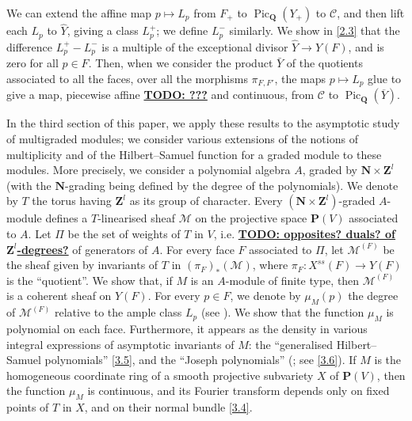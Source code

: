 \documentclass{article}
\newcommand{\sh}{\mathscr}
\newcommand{\PP}{\mathbf{P}}
\newcommand{\QQ}{\mathbf{Q}}
\newcommand{\NN}{\mathbf{N}}
\newcommand{\ZZ}{\mathbf{Z}}
\DeclareMathOperator{\Pic}{Pic}
\newcommand{\unsure}[1]{\underline{\textbf{TODO: #1}}}
\newcommand{\oldpage}[1]{\marginpar{\footnotesize$\Big\vert$ \textit{p.~#1}}}
\begin{document}
We can extend the affine map $p\mapsto L_p$ from $F_+$ to $\Pic_\QQ(Y_+)$ to $\mathcal{C}$, and then lift each $L_p$ to $\hat{Y}$, giving a class $L_p^+$;
we define $L_p^-$ similarly.
We show in \cref{2.3} that the difference $L_p^+ - L_p^-$ is a multiple of the exceptional divisor $\hat{Y}\to Y(F)$, and is zero for all $p\in F$.
Then, when we consider the product $\bar{Y}$ of the quotients associated to all the faces, over all the morphisms $\pi_{F,F'}$, the maps $p\mapsto L_p$ glue to give a map, piecewise affine \unsure{???} and continuous, from $\mathcal{C}$ to $\Pic_\QQ(\overline{Y})$.

In the third section of this paper, we apply these results to the asymptotic study of multigraded modules;
we consider various extensions of the notions of multiplicity and of the Hilbert--Samuel function for a graded module to these modules.
More precisely, we consider a polynomial algebra $A$, graded by $\NN\times\ZZ^l$ (with the $\NN$-grading being defined by the degree of the polynomials).
We denote by $T$ the torus having $\ZZ^l$ as its group of character.
Every $(\NN\times\ZZ^l)$-graded $A$-module defines
\oldpage{511}
a $T$-linearised sheaf $\sh{M}$ on the projective space $\PP(V)$ associated to $A$.
Let $\Pi$ be the set of weights of $T$ in $V$, i.e. \unsure{opposites? duals? of $\ZZ^l$-degrees?} of generators of $A$.
For every face $F$ associated to $\Pi$, let $\sh{M}^{(F)}$ be the sheaf given by invariants of $T$ in $(\pi_F)_*(\sh{M})$, where $\pi_F\colon X^{ss}(F)\to Y(F)$ is the ``quotient''.
We show that, if $M$ is an $A$-module of finite type, then $\sh{M}^{(F)}$ is a coherent sheaf on $Y(F)$.
For every $p\in F$, we denote by $\mu_M(p)$ the degree of $\sh{M}^{(F)}$ relative to the ample class $L_p$ (see \cite[I.3]{Kle}).
We show that the function $\mu_M$ is polynomial on each face.
Furthermore, it appears as the density in various integral expressions of asymptotic invariants of $M$: the ``generalised Hilbert--Samuel polynomials'' \cref{3.5}, and the ``Joseph polynomials'' (\cite{Jos}; see \cref{3.6}).
If $M$ is the homogeneous coordinate ring of a smooth projective subvariety $X$ of $\PP(V)$, then the function $\mu_M$ is continuous, and its Fourier transform depends only on fixed points of $T$ in $X$, and on their normal bundle \cref{3.4}.
\end{document}
